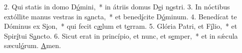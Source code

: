 2. Qui statis in domo D\uline{ó}mini,~* in átriis domus D\uline{e}i n\uline{o}stri.
3. In nóctibus extóllite manus vestras in s\uline{a}ncta,~* et bened\uline{í}cite D\uline{ó}minum.
4. Benedícat te Dóminus ex S\uline{i}on,~* qui fecit c\uline{æ}lum et t\uline{e}rram.
5. Glória Patri, et F\uline{í}lio,~* et Spir\uline{í}tui S\uline{a}ncto.
6. Sicut erat in princípio, et nunc, et s\uline{e}mper,~* et in sǽcula sæcul\uline{ó}rum. \uline{A}men.
